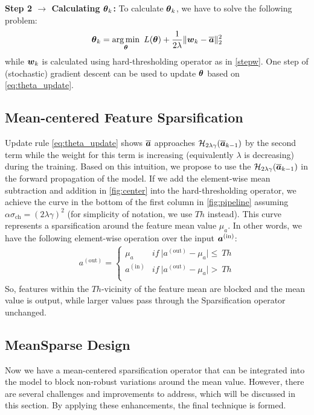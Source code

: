 \documentclass[conference]{IEEEtran}
\newcommand{\argmin}{\operatornamewithlimits{arg\,min}}
\begin{document}
\textbf{Step 2 $\rightarrow$ Calculating $\boldsymbol{\theta}_k$:}
To calculate $\boldsymbol{\theta}_k$, we have to solve the following problem:
\begin{align}
    \thetab_{k} = \argmin_{\thetab}~L(\thetab)+\frac{1}{2\lambda}\Vert \wb_k-\overline{\abn}\Vert_2^2\label{eq:theta_update}
\end{align}
while $\boldsymbol{w}_k$ is calculated using hard-thresholding operator as in \eqref{stepw}. One step of (stochastic) gradient descent can be used to update $\boldsymbol{\theta}$ based on \eqref{eq:theta_update}.

\subsection{Mean-centered Feature Sparsification}
Update rule \eqref{eq:theta_update} shows $\overline{\boldsymbol{a}}$ approaches $\mathcal{H}_{2\lambda\gamma}(\overline{\boldsymbol{a}}_{k-1})$ by the second term while the weight for this term is increasing (equivalently $\lambda$ is decreasing) during the training. Based on this intuition, we propose to use the $\mathcal{H}_{2\lambda\gamma}(\overline{\boldsymbol{a}}_{k-1})$ in the forward propagation of the model. If we add the element-wise mean subtraction and addition in \ref{fig:center} into the hard-thresholding operator, we achieve the curve in the bottom of the first column in \ref{fig:pipeline} assuming $\alpha\sigma_{\mathrm{ch}} = (2\lambda\gamma)^2$ (for simplicity of notation, we use $Th$ instead). This curve represents a sparsification around the feature mean value $\mu_a$. In other words, we have the following element-wise operation over the input $\boldsymbol{a}^{(\text{in})}$:
\begin{align*}
    a^{(\text{out})} =
    \begin{cases}
        \mu_a & if~ \vert a^{(\text{out})} - \mu_a \vert \leq~Th \\
        a^{(\text{in})} & if~ \vert a^{(\text{out})} - \mu_a \vert >~Th\\
    \end{cases}
\end{align*}
So, features within the $Th$-vicinity of the feature mean are blocked and the mean value is output, while larger values pass through the Sparsification operator unchanged.

\subsection{MeanSparse Design}
Now we have a mean-centered sparsification operator that can be integrated into the model to block non-robust variations around the mean value. However, there are several challenges and improvements to address, which will be discussed in this section. By applying these enhancements, the final technique is formed.
\end{document}
